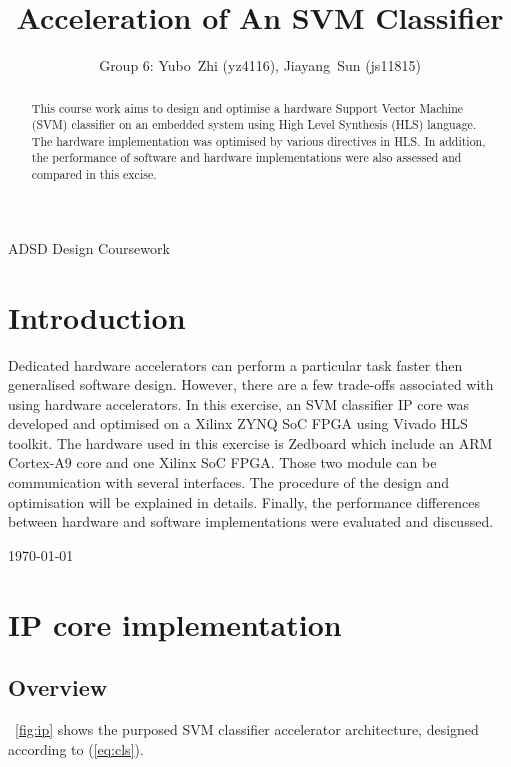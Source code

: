 \documentclass[journal]{IEEEtran}
\newcommand{\fref}[1]{\figurename~\ref{#1}}
\newcommand{\eref}[1]{(\ref{#1})}
\begin{document}
\title{Acceleration of An SVM Classifier}

\author{Group 6: Yubo~Zhi (yz4116), Jiayang~Sun (js11815)}

%
{ADSD Design Coursework}

\maketitle

\begin{abstract}
This course work aims to design and optimise a hardware Support Vector Machine (SVM) classifier on an embedded system using High Level Synthesis (HLS) language. The hardware implementation was optimised by various directives in HLS. In addition, the performance of software and hardware implementations were also assessed and compared in this excise.
\end{abstract}

\section{Introduction}

Dedicated hardware accelerators can perform a particular task faster then generalised software design. However, there are a few trade-offs associated with using hardware accelerators. In this exercise, an SVM classifier IP core was developed and optimised on a Xilinx ZYNQ SoC FPGA using Vivado HLS toolkit. The hardware used in this exercise is Zedboard which include an ARM Cortex-A9 core and one Xilinx SoC FPGA. Those two module can be communication with several interfaces. The procedure of the design and optimisation will be explained in details. Finally, the performance differences between hardware and software implementations were evaluated and discussed.

\hfill \today

\section{IP core implementation}

\subsection{Overview}

\fref{fig:ip} shows the purposed SVM classifier accelerator architecture, designed according to \eref{eq:cls}.
\end{document}
